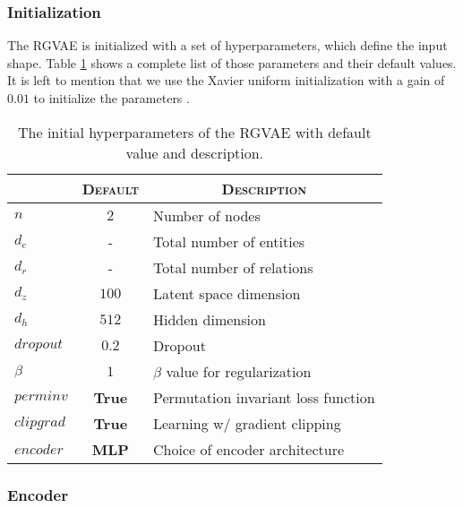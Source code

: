 \subsubsection{Initialization}

The RGVAE is initialized with a set of hyperparameters, which define the input shape. Table \ref{tab:RGVAEhyp} shows a complete list of those parameters and their default values. It is left to mention that we use the Xavier uniform initialization with a gain of $0.01$ to initialize the parameters \cite{glorot2010understanding}.

\begin{table}[H]
\centering
    \begin{tabular}{|l|l|l|}
    \hline
    \rowcolor[HTML]{EFEFEF}
    \multicolumn{1}{|c}{\textsc{Hyerp.}} & \multicolumn{1}{c}{\textsc{Default}} & \multicolumn{1}{c|}{\textsc{Description}} \\\hline
    $n$     & \multicolumn{1}{c|}{$2$} & Number of nodes  \\
    $d_e$   &\multicolumn{1}{c|}{-}   & Total number of entities\\
    $d_r$   &\multicolumn{1}{c|}{-} & Total number of relations\\
    $d_z$ &\multicolumn{1}{c|}{$100$}   & Latent space dimension\\
    $d_h$ &\multicolumn{1}{c|}{$512$}   & Hidden dimension\\
    $dropout$ &\multicolumn{1}{c|}{$0.2$}   & Dropout\\
    $\beta$ & \multicolumn{1}{c|}{$1$}  & $\beta$ value for regularization  \\
    $perminv$ & \multicolumn{1}{c|}{\textbf{True}}  & Permutation invariant loss function  \\
    $clipgrad$ & \multicolumn{1}{c|}{\textbf{True}}  & Learning w/ gradient clipping  \\
    $encoder$ & \multicolumn{1}{c|}{\textbf{MLP}}  & Choice of encoder architecture  \\
    \hline
    \end{tabular}
    \caption{The initial hyperparameters of the RGVAE with default value and description.}
    \label{tab:RGVAEhyp}
\end{table}


\subsubsection{Encoder}

